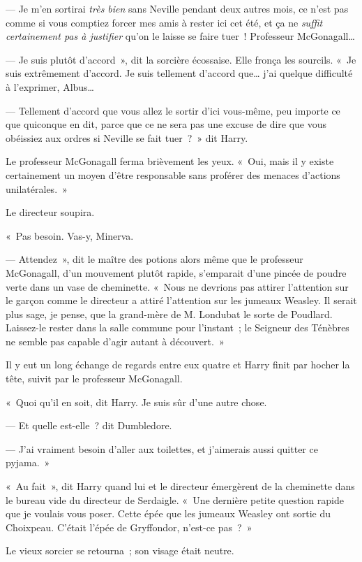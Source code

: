 --- Je m'en sortirai \emph{très bien} sans Neville pendant deux autres mois, ce n'est pas comme si vous comptiez forcer mes amis à rester ici cet été, et ça ne \emph{suffit certainement pas à justifier} qu'on le laisse se faire tuer~! Professeur McGonagall…

--- Je suis plutôt d'accord~», dit la sorcière écossaise. Elle fronça les sourcils. «~Je suis extrêmement d'accord. Je suis tellement d'accord que… j'ai quelque difficulté à l'exprimer, Albus…

--- Tellement d'accord que vous allez le sortir d'ici vous-même, peu importe ce que quiconque en dit, parce que ce ne sera pas une excuse de dire que vous obéissiez aux ordres si Neville se fait tuer~?~» dit Harry.

Le professeur McGonagall ferma brièvement les yeux. «~Oui, mais il y existe certainement un moyen d'être responsable sans proférer des menaces d'actions unilatérales.~»

Le directeur soupira.

«~Pas besoin. Vas-y, Minerva.

--- Attendez~», dit le maître des potions alors même que le professeur McGonagall, d'un mouvement plutôt rapide, s'emparait d'une pincée de poudre verte dans un vase de cheminette. «~Nous ne devrions pas attirer l'attention sur le garçon comme le directeur a attiré l'attention sur les jumeaux Weasley. Il serait plus sage, je pense, que la grand-mère de M. Londubat le sorte de Poudlard. Laissez-le rester dans la salle commune pour l'instant~; le Seigneur des Ténèbres ne semble pas capable d'agir autant à découvert.~»

Il y eut un long échange de regards entre eux quatre et Harry finit par hocher la tête, suivit par le professeur McGonagall.

«~Quoi qu'il en soit, dit Harry. Je suis sûr d'une autre chose.

--- Et quelle est-elle~? dit Dumbledore.

--- J'ai vraiment besoin d'aller aux toilettes, et j'aimerais aussi quitter ce pyjama.~»

\later

«~Au fait~», dit Harry quand lui et le directeur émergèrent de la cheminette dans le bureau vide du directeur de Serdaigle. «~Une dernière petite question rapide que je voulais vous poser. Cette épée que les jumeaux Weasley ont sortie du Choixpeau. C'était l'épée de Gryffondor, n'est-ce pas~?~»

Le vieux sorcier se retourna~; son visage était neutre.

